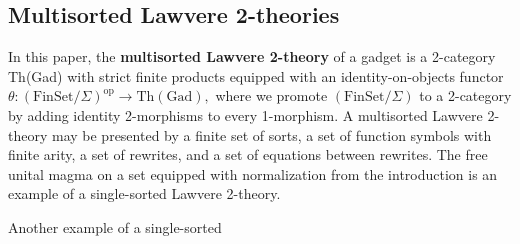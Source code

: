 \documentclass{article}
\newcommand{\maps}{\colon}
\newcommand{\FinSet}{\mathrm{FinSet}}
\newcommand{\op}{\mathrm{op}}
\begin{document}
\subsection {Multisorted Lawvere 2-theories}
In this paper, the {\bf multisorted Lawvere 2-theory} of a gadget is a 2-category Th(Gad) with strict finite products equipped with an identity-on-objects functor $\theta\maps (\FinSet/\Sigma)^\op \to \mathrm{Th(Gad)},$ where we promote $(\FinSet/\Sigma)$ to a 2-category by adding identity 2-morphisms to every 1-morphism.  A multisorted Lawvere 2-theory may be presented by a finite set of sorts, a set of function symbols with finite arity, a set of rewrites, and a set of equations between rewrites.  The free unital magma on a set equipped with normalization from the introduction is an example of a single-sorted Lawvere 2-theory.  

Another example of a single-sorted
\end{document}

